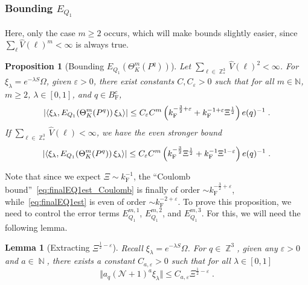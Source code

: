 \documentclass[12pt,a4paper]{article}
\numberwithin{equation}{section}
\newcommand{\cN}{\mathcal{N}}
\newcommand{\NNN}{\mathbb{N}}
\newcommand{\1}{\mathbb{I}}
\newcommand{\F}{\mathrm{F}}
\DeclareMathOperator{\N}{\mathbb{N}}
\DeclareMathOperator{\Z}{\mathbb{Z}}
\newcommand{\half}{\frac{1}{2}}
\newcommand{\eva}[1]{\left\langle #1 \right\rangle}
\theoremstyle{plain}
\newtheorem{lemma}[theorem]{Lemma}
\newtheorem{proposition}[theorem]{Proposition}
\theoremstyle{definition}
\theoremstyle{remark}
\theoremstyle{plain}
\theoremstyle{definition}
\theoremstyle{remark}
\begin{document}
\subsubsection{Bounding $E_{Q_1}$}

\textcolor{green!30!black}{Here, only the case $ m \ge 2 $ occurs, which will make bounds slightly easier, since $ \sum_\ell \hat{V}(\ell)^m < \infty $ is always true.}

\begin{proposition}[Bounding $E_{Q_1}(\Theta^m_{K}(P^q))$]\label{prop:finEQ1est}
Let $ \sum_{\ell \in \Z^3_*} \hat{V}(\ell)^2 < \infty $. For $\xi_\lambda = e^{-\lambda S} \Omega$, given $ \varepsilon > 0 $, there exist constants $ C, C_\varepsilon > 0 $ such that for all $ m \in \NNN $, $ m \ge 2 $, $ \lambda \in [0,1] $, and $ q \in B_{\F}^c $,
\begin{equation} \label{eq:finalEQ1est_Coulomb}
	\abs{\eva{\xi_\lambda, E_{Q_1}\!\left(\Theta^m_K(P^q)\right) \xi_\lambda}}
	\leq C_\varepsilon C^m \left( k_{\F}^{-\frac 32 + \varepsilon}
		+ k_{\F}^{-1 + \varepsilon} \Xi^\half \right)
		e(q)^{-1} \;.
\end{equation}
If $ \sum_{\ell \in \Z^3_*} \hat{V}(\ell) < \infty $, we have the even stronger bound
\begin{equation} \label{eq:finalEQ1est}
	\abs{\eva{\xi_\lambda, E_{Q_1}\!\left(\Theta^m_K(P^q)\right) \xi_\lambda}}
	\leq C_\varepsilon C^m \left(
		k_{\F}^{-\frac{3}{2}} \Xi^\half
		+ k_{\F}^{-1}\Xi^{1-\varepsilon} \right) e(q)^{-1} \;.
\end{equation}
\end{proposition}


\textcolor{green!30!black}{Note that since we expect $ \Xi \sim k_{\F}^{-1} $, the ``Coulomb bound''~\eqref{eq:finalEQ1est_Coulomb} is finally of order $ \sim k_{\F}^{-\frac 32 + \varepsilon} $, while~\eqref{eq:finalEQ1est} is even of order $ \sim k_{\F}^{-2 + \varepsilon} $.}
To prove this proposition, we need to control the error terms $ E^{m,1}_{Q_1} $, $ E^{m,2}_{Q_1} $, and $ E^{m,3}_{Q_1} $. For this, we will need the following lemma.

\begin{lemma} [Extracting $ \Xi^{\half-\varepsilon} $] \label{lem:Xi_halfminusepsilon}
Recall $ \xi_\lambda = e^{-\lambda S} \Omega $. For $ q \in \Z^3 $, given any $ \varepsilon > 0 $ and $ a \in \N $, there exists a constant $ C_{a,\varepsilon} > 0 $ such that for all $ \lambda \in [0,1] $
\begin{equation} \label{eq:Xi_halfminusepsilon}
	\Vert a_q (\cN + 1)^a \xi_\lambda \Vert
	\le C_{a,\varepsilon} \Xi^{\half-\varepsilon} \;.
\end{equation}
\end{lemma}
\end{document}
